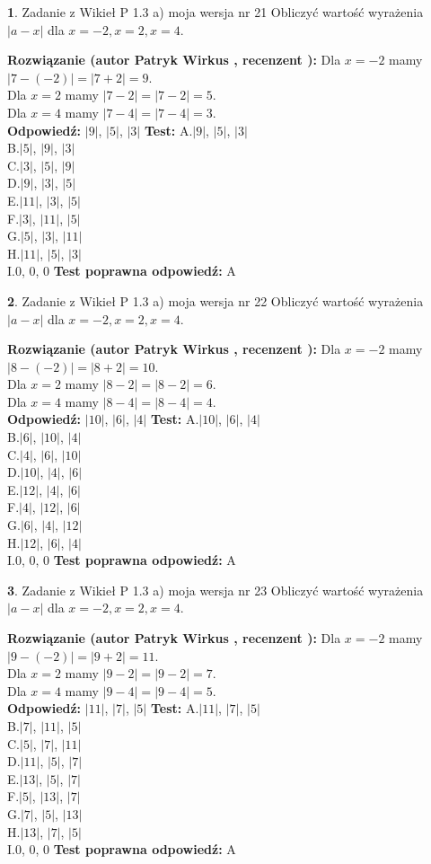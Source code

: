 \documentclass[12pt, a4paper]{article}
\theoremstyle{definition} %
\newtheorem{zad}{}
\newcommand{\zadStart}[1]{\begin{zad}#1\newline}
\newcommand{\zadStop}{\end{zad}}
\newcommand{\rozwStart}[2]{\noindent \textbf{Rozwiązanie (autor #1 , recenzent #2): }\newline}
\newcommand{\rozwStop}{\newline}
\newcommand{\odpStart}{\noindent \textbf{Odpowiedź:}\newline}
\newcommand{\odpStop}{\newline}
\newcommand{\testStart}{\noindent \textbf{Test:}\newline}
\newcommand{\testStop}{\newline}
\newcommand{\kluczStart}{\noindent \textbf{Test poprawna odpowiedź:}\newline}
\newcommand{\kluczStop}{\newline}
\begin{document}
\zadStart{Zadanie z Wikieł P 1.3 a) moja wersja nr 21}
Obliczyć wartość wyrażenia $|a - x|$ dla $x=-2,x=2,x=4$.
\zadStop
\rozwStart{Patryk Wirkus}{}
Dla $x = -2$ mamy $|7 - (-2)| = |7 + 2| = 9$.\\
Dla $x = 2$ mamy $|7 - 2| = |7 - 2| = 5$.\\
Dla $x = 4$ mamy $|7 - 4| = |7 - 4| = 3$.\\
\rozwStop
\odpStart
$|9|$, $|5|$, $|3|$
\odpStop
\testStart
A.$|9|$, $|5|$, $|3|$\\
B.$|5|$, $|9|$, $|3|$\\
C.$|3|$, $|5|$, $|9|$\\
D.$|9|$, $|3|$, $|5|$\\
E.$|11|$, $|3|$, $|5|$\\
F.$|3|$, $|11|$, $|5|$\\
G.$|5|$, $|3|$, $|11|$\\
H.$|11|$, $|5|$, $|3|$\\
I.$0$, $0$, $0$
\testStop
\kluczStart
A
\kluczStop



\zadStart{Zadanie z Wikieł P 1.3 a) moja wersja nr 22}
Obliczyć wartość wyrażenia $|a - x|$ dla $x=-2,x=2,x=4$.
\zadStop
\rozwStart{Patryk Wirkus}{}
Dla $x = -2$ mamy $|8 - (-2)| = |8 + 2| = 10$.\\
Dla $x = 2$ mamy $|8 - 2| = |8 - 2| = 6$.\\
Dla $x = 4$ mamy $|8 - 4| = |8 - 4| = 4$.\\
\rozwStop
\odpStart
$|10|$, $|6|$, $|4|$
\odpStop
\testStart
A.$|10|$, $|6|$, $|4|$\\
B.$|6|$, $|10|$, $|4|$\\
C.$|4|$, $|6|$, $|10|$\\
D.$|10|$, $|4|$, $|6|$\\
E.$|12|$, $|4|$, $|6|$\\
F.$|4|$, $|12|$, $|6|$\\
G.$|6|$, $|4|$, $|12|$\\
H.$|12|$, $|6|$, $|4|$\\
I.$0$, $0$, $0$
\testStop
\kluczStart
A
\kluczStop



\zadStart{Zadanie z Wikieł P 1.3 a) moja wersja nr 23}
Obliczyć wartość wyrażenia $|a - x|$ dla $x=-2,x=2,x=4$.
\zadStop
\rozwStart{Patryk Wirkus}{}
Dla $x = -2$ mamy $|9 - (-2)| = |9 + 2| = 11$.\\
Dla $x = 2$ mamy $|9 - 2| = |9 - 2| = 7$.\\
Dla $x = 4$ mamy $|9 - 4| = |9 - 4| = 5$.\\
\rozwStop
\odpStart
$|11|$, $|7|$, $|5|$
\odpStop
\testStart
A.$|11|$, $|7|$, $|5|$\\
B.$|7|$, $|11|$, $|5|$\\
C.$|5|$, $|7|$, $|11|$\\
D.$|11|$, $|5|$, $|7|$\\
E.$|13|$, $|5|$, $|7|$\\
F.$|5|$, $|13|$, $|7|$\\
G.$|7|$, $|5|$, $|13|$\\
H.$|13|$, $|7|$, $|5|$\\
I.$0$, $0$, $0$
\testStop
\kluczStart
A
\kluczStop
\end{document}
